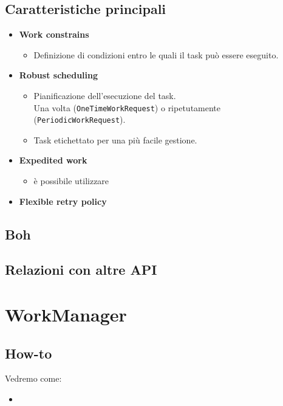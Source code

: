 \subsection{Caratteristiche principali}
\begin{itemize}
    \item \textbf{Work constrains}
    \begin{itemize}
        \item Definizione di condizioni entro le quali il task può essere eseguito.
    \end{itemize}
    \item \textbf{Robust scheduling}
    \begin{itemize}
        \item Pianificazione dell'esecuzione del task.\\
        Una volta (\texttt{OneTimeWorkRequest}) o ripetutamente (\texttt{PeriodicWorkRequest}).
        \item Task etichettato per una più facile gestione.
    \end{itemize}
    \item \textbf{Expedited work}
    \begin{itemize}
        \item è possibile utilizzare 
    \end{itemize}
    \item \textbf{Flexible retry policy}
\end{itemize}

\subsection{Boh}

\subsection{Relazioni con altre API}

\section{WorkManager}
\subsection{How-to}
\par Vedremo come:
\begin{itemize}
    \item 
\end{itemize}

